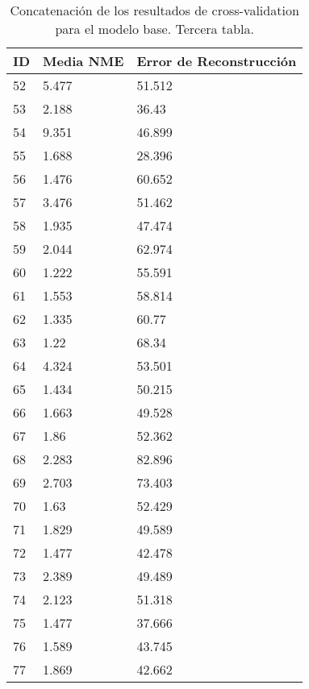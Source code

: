 \begin{table}[!ht]
    \centering
    \caption{Concatenación de los resultados de cross-validation para el modelo base. Tercera tabla.}
    \begin{tabular}{|l|l|l|}
    \hline
        \cellcolor{gray!25}\textbf{ID} & \cellcolor{gray!25}\textbf{Media NME} & \cellcolor{gray!25}\textbf{Error de Reconstrucción} \\ \hline
        52 & 5.477 & 51.512 \\ \hline
        53 & 2.188 & 36.43 \\ \hline
        54 & 9.351 & 46.899 \\ \hline
        55 & 1.688 & 28.396 \\ \hline
        56 & 1.476 & 60.652 \\ \hline
        57 & 3.476 & 51.462 \\ \hline
        58 & 1.935 & 47.474 \\ \hline
        59 & 2.044 & 62.974 \\ \hline
        60 & 1.222 & 55.591 \\ \hline
        61 & 1.553 & 58.814 \\ \hline
        62 & 1.335 & 60.77 \\ \hline
        63 & 1.22 & 68.34 \\ \hline
        64 & 4.324 & 53.501 \\ \hline
        65 & 1.434 & 50.215 \\ \hline
        66 & 1.663 & 49.528 \\ \hline
        67 & 1.86 & 52.362 \\ \hline
        68 & 2.283 & 82.896 \\ \hline
        69 & 2.703 & 73.403 \\ \hline
        70 & 1.63 & 52.429 \\ \hline
        71 & 1.829 & 49.589 \\ \hline
        72 & 1.477 & 42.478 \\ \hline
        73 & 2.389 & 49.489 \\ \hline
        74 & 2.123 & 51.318 \\ \hline
        75 & 1.477 & 37.666 \\ \hline
        76 & 1.589 & 43.745 \\ \hline
        77 & 1.869 & 42.662 \\ \hline
    \end{tabular}
    \label{table:ModelBase_landmarkresume}
\end{table}


